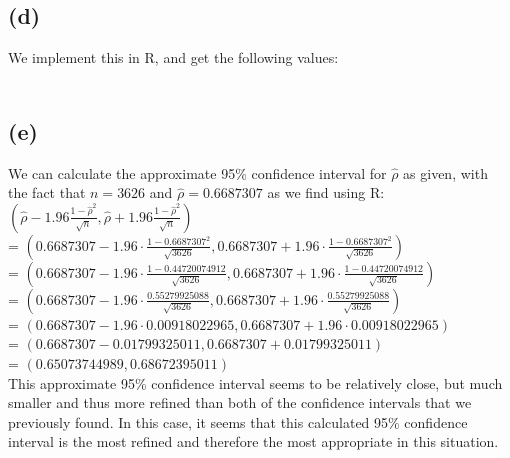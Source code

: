 \documentclass{article}
\begin{document}
{\subsection*{(d)}

We implement this in R, and get the following values: \\ 
 \\ 

\subsection*{(e)}

We can calculate the approximate 95\% confidence interval for $\hat{\rho}$ as given, with the fact that $n = 3626$ and $\hat{\rho} = 0.6687307$ as we find using R: \\
$(\hat{\rho} - 1.96 \frac{1 - \hat{\rho}^2}{\sqrt{n}}, \hat{\rho} + 1.96 \frac{1 - \hat{\rho}^2}{\sqrt{n}})$ \\
= $(0.6687307 - 1.96 \cdot \frac{1 - 0.6687307^2}{\sqrt{3626}}, 0.6687307 + 1.96 \cdot \frac{1 - 0.6687307^2}{\sqrt{3626}})$ \\
= $(0.6687307 - 1.96 \cdot \frac{1 - 0.44720074912}{\sqrt{3626}}, 0.6687307 + 1.96 \cdot \frac{1 - 0.44720074912}{\sqrt{3626}})$ \\
= $(0.6687307 - 1.96 \cdot \frac{0.55279925088}{\sqrt{3626}}, 0.6687307 + 1.96 \cdot \frac{0.55279925088}{\sqrt{3626}})$ \\
= $(0.6687307 - 1.96 \cdot 0.00918022965, 0.6687307 + 1.96 \cdot 0.00918022965)$ \\
= $(0.6687307 - 0.01799325011, 0.6687307 + 0.01799325011)$ \\
= $(0.65073744989, 0.68672395011)$ \\
This approximate 95\% confidence interval seems to be relatively close, but much smaller and thus more refined than both of the confidence intervals that we previously found. In this case, it seems that this calculated 95\% confidence interval is the most refined and therefore the most appropriate in this situation.
\newpage

}
\end{document}
